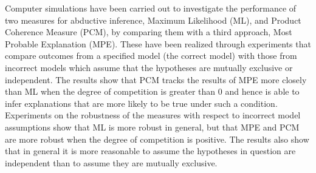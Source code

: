 Computer simulations have been carried out to investigate the performance of two measures for abductive inference, Maximum Likelihood (ML), and Product Coherence Measure (PCM), by comparing them with a third approach, Most Probable Explanation (MPE). These have been realized through experiments that compare outcomes from a specified model (the correct model) with those from incorrect models which assume that the hypotheses are mutually exclusive or independent. The results show that PCM tracks the results of MPE more closely than ML when the degree of competition is greater than 0 and hence is able to infer explanations that are more likely to be true under such a condition. Experiments on the robustness of the measures with respect to incorrect model assumptions show that ML is more robust in general, but that MPE and PCM are more robust when the degree of competition is positive.  The results also show that in general it is more reasonable to assume the hypotheses in question are independent than to assume they are mutually exclusive. 



